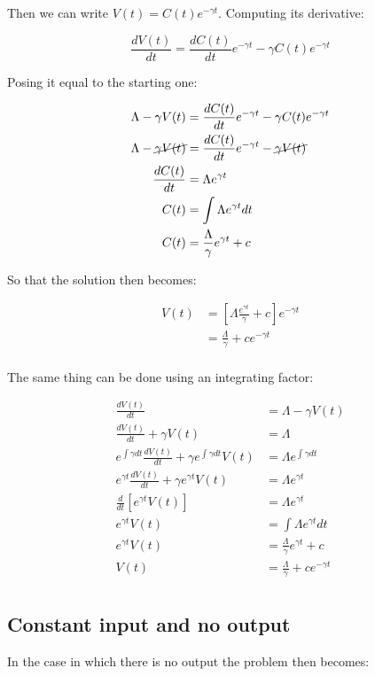  Then we can write $V(t) = C(t)e^{-\gamma t}$.
  Computing its derivative:

  $$\frac{dV(t)}{dt} = \frac{dC(t)}{dt}e^{-\gamma t} - \gamma C(t)e^{-\gamma t}$$

  Posing it equal to the starting one:

  \begin{align*}
    \Lambda - \gamma V(t) &= \frac{dC(t)}{dt}e^{-\gamma t} -\gamma C(t)e^{-\gamma t}\\
    \Lambda - \cancel{\gamma V(t)} &= \frac{dC(t)}{dt}e^{-\gamma t} -\cancel{\gamma V(t)}\\
    \frac{dC(t)}{dt} &= \Lambda e^{\gamma t}\\
    C(t) &= \int\Lambda e^{\gamma t}dt\\
    C(t) &= \frac{\Lambda}{\gamma}e^{\gamma t} + c\\
  \end{align*}

  So that the solution then becomes:

  \begin{align*}
    V(t) &= \left[\Lambda\frac{e^{\gamma t}}{\gamma} + c\right]e^{-\gamma t}\\
         &= \frac{\Lambda}{\gamma} + ce^{-\gamma t}\\
  \end{align*}

  The same thing can be done using an integrating factor:

  \begin{align*}
    \frac{dV(t)}{dt} &= \Lambda - \gamma V(t)\\
    \frac{dV(t)}{dt} + \gamma V(t) &= \Lambda\\
    e^{\int \gamma dt}\frac{dV(t)}{dt} + \gamma e^{\int\gamma dt}V(t) &= \Lambda e^{\int\gamma dt}\\
    e^{\gamma t}\frac{dV(t)}{dt} + \gamma e^{\gamma t}V(t) &= \Lambda e^{\gamma t}\\
    \frac{d}{dt}\left[e^{\gamma t}V(t)\right] &= \Lambda e^{\gamma t}\\
    e^{\gamma t}V(t) &= \int\Lambda e^{\gamma t}dt\\
    e^{\gamma t}V(t) &= \frac{\Lambda}{\gamma}e^{\gamma t} + c\\
    V(t) &= \frac{\Lambda}{\gamma} + ce^{-\gamma t}\\
  \end{align*}


  \subsection{Constant input and no output}
  In the case in which there is no output the problem then becomes:

